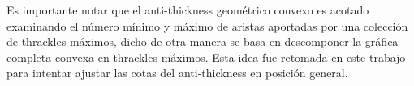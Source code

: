 Es importante notar que el anti-thickness geométrico convexo es acotado examinando el número mínimo
y máximo de aristas aportadas por una colección de thrackles máximos, dicho de
otra manera se basa en descomponer la gráfica completa convexa en thrackles máximos.
Esta idea fue retomada en este trabajo para intentar ajustar las cotas del anti-thickness
en posición general.
